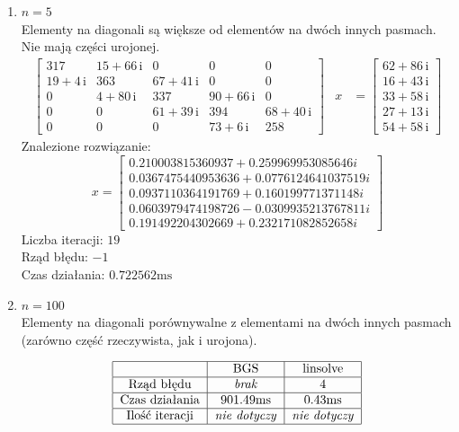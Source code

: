\documentclass[12pt]{article}
\begin{document}
\begin{enumerate}[label=\textbf{Układ \arabic*}]
		\item
			$n = 5$\\
			Elementy na diagonali są większe od elementów na dwóch innych pasmach. Nie mają części urojonej.
			\begin{align*}
				\left[
					\begin{array}{ccccc} 317 & 15 + 66\, \mathrm{i} & 0 & 0 & 0\\ 19 + 4\, \mathrm{i} & 363 & 67 + 41\, \mathrm{i} & 0 & 0\\ 0 & 4 + 80\, \mathrm{i} & 337 & 90 + 66\, \mathrm{i} & 0\\ 0 & 0 & 61 + 39\, \mathrm{i} & 394 & 68 + 40\, \mathrm{i}\\ 0 & 0 & 0 & 73 + 6\, \mathrm{i} & 258 \end{array}
				\right]
				&x
				&=
				\left[
					\begin{array}{c} 62 + 86\, \mathrm{i}\\ 16 + 43\, \mathrm{i}\\ 33 + 58\, \mathrm{i}\\ 27 + 13\, \mathrm{i}\\ 54 + 58\, \mathrm{i} \end{array}
				\right]
			\end{align*}
			Znalezione rozwiązanie:
			$$
			x =
				\left[
					\begin{array}{c}
						0.210003815360937 + 0.259969953085646i\\
						0.0367475440953636 + 0.0776124641037519i\\
						0.0937110364191769 + 0.160199771371148i\\
						0.0603979474198726 - 0.0309935213767811i\\
						0.191492204302669 + 0.232171082852658i
					\end{array}
				\right]
			$$
			Liczba iteracji: $19$\\
			Rząd błędu: $-1$\\
			Czas działania: $0.722562\text{ms}$
		
		\item
			$n = 100$\\
			Elementy na diagonali porównywalne z elementami na dwóch innych pasmach (zarówno część rzeczywista, jak i urojona).
			
			\begin{align*}
				\begin{tabular}{|c|c|c|}
					\hline
					               &         BGS          &       linsolve       \\ \hline
					  Rząd błędu   &    \textit{brak}     &          4           \\ \hline
					Czas działania &  $901.49\text{ms}$   &   $0.43\text{ms}$    \\ \hline
					Ilość iteracji & \textit{nie dotyczy} & \textit{nie dotyczy} \\ \hline
				\end{tabular}
			\end{align*}
		

\end{enumerate}
\end{document}
